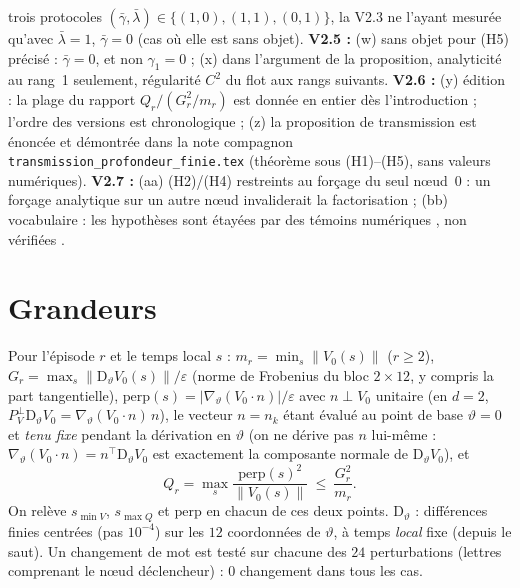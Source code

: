 \documentclass[11pt,a4paper]{article}
\theoremstyle{remark}
\newcommand{\norm}[1]{\lVert #1\rVert}
\newcommand{\vth}{\vartheta}
\newcommand{\D}{\mathrm D}
\begin{document}
trois protocoles $(\bar\gamma,\bar\lambda)\in\{(1,0),(1,1),(0,1)\}$, la V2.3 ne l'ayant mesur\'ee qu'avec $\bar\lambda=1$, $\bar\gamma=0$ (cas o\`u elle est sans objet). \textbf{V2.5 :} (w) \og sans objet \fg{} pour (H5) pr\'ecis\'e : $\bar\gamma=0$, et non $\gamma_1=0$ ; (x) dans l'argument de la proposition, analyticit\'e au rang~1 seulement, r\'egularit\'e $C^2$ du flot aux rangs suivants. \textbf{V2.6 :} (y) \'edition : la plage du rapport $Q_r/(G_r^2/m_r)$ est donn\'ee en entier d\`es l'introduction ; l'ordre des versions est chronologique ; (z) la proposition de transmission est \'enonc\'ee et d\'emontr\'ee dans la note compagnon \texttt{transmission\_profondeur\_finie.tex} (th\'eor\`eme sous (H1)--(H5), sans valeurs num\'eriques). \textbf{V2.7 :} (aa) (H2)/(H4) restreints au for\c{c}age du seul n\oe ud~0 : un for\c{c}age analytique sur un autre n\oe ud invaliderait la factorisation ; (bb) vocabulaire : les hypoth\`eses sont \og \'etay\'ees par des t\'emoins num\'eriques \fg{}, non \og v\'erifi\'ees \fg.

\section{Grandeurs}
Pour l'\'episode $r$ et le temps local $s$ : $m_r=\min_s\norm{V_0(s)}$ ($r\ge2$), $G_r=\max_s\norm{\D_\vth V_0(s)}/\varepsilon$ (norme de Frobenius du bloc $2\times12$, y compris la part tangentielle), $\mathrm{perp}(s)=\lvert\nabla_\vth(V_0\!\cdot n)\rvert/\varepsilon$ avec $n\perp V_0$ unitaire (en $d=2$, $P^\perp_V\D_\vth V_0=\nabla_\vth(V_0\!\cdot n)\,n$), le vecteur $n=n_k$ \'etant \'evalu\'e au point de base $\vth=0$ et \emph{tenu fixe} pendant la d\'erivation en $\vth$ (on ne d\'erive pas $n$ lui-m\^eme : $\nabla_\vth(V_0\!\cdot n)=n^\top\D_\vth V_0$ est exactement la composante normale de $\D_\vth V_0$), et
\[
Q_r=\max_s\frac{\mathrm{perp}(s)^2}{\norm{V_0(s)}}\ \le\ \frac{G_r^2}{m_r}.
\]
On relève $s_{\min V}$, $s_{\max Q}$ et $\mathrm{perp}$ en chacun de ces deux points. $\D_\vth$ : diff\'erences finies centr\'ees (pas $10^{-4}$) sur les $12$ coordonn\'ees de $\vth$, \`a temps \emph{local} fixe (depuis le saut). Un changement de mot est test\'e sur chacune des $24$ perturbations (lettres comprenant le n\oe ud d\'eclencheur) : $0$ changement dans tous les cas.
\end{document}
